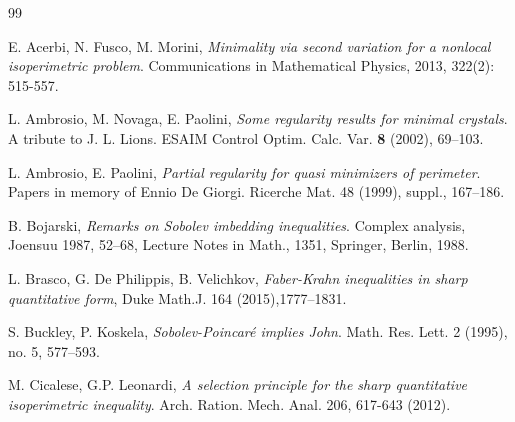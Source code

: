 \documentclass[reqno,11pt]{amsart}
\numberwithin{equation}{section}
\theoremstyle{remark}
\begin{document}
\begin{thebibliography}{99}

E. Acerbi, N. Fusco, M. Morini, \emph{Minimality via second variation for
a nonlocal isoperimetric problem}. Communications in Mathematical Physics, 2013, 322(2): 515-557.

L. Ambrosio, M. Novaga, E.  Paolini, 
\emph{Some regularity results for minimal crystals}.  A tribute to J. L. Lions. 
ESAIM Control Optim. Calc. Var. \textbf{8} (2002), 69--103.
 
 L. Ambrosio, E. Paolini, \emph{Partial regularity for quasi minimizers of perimeter}. Papers in memory of Ennio De Giorgi. Ricerche Mat. 48 (1999), suppl., 167--186.


 B. Bojarski,
\emph{Remarks on Sobolev imbedding inequalities}. Complex analysis, Joensuu 1987, 52--68,
Lecture Notes in Math., 1351, Springer, Berlin, 1988.


 
L. Brasco, G. De Philippis, B. Velichkov, \emph{Faber-Krahn inequalities in sharp quantitative form}, Duke Math.J.
 164 (2015),1777--1831.

S. Buckley, P.  Koskela, \emph{Sobolev-Poincar\'e implies John}.  
Math. Res. Lett. 2 (1995), no. 5, 577--593.



M. Cicalese, G.P. Leonardi, \emph{A selection principle for the sharp quantitative isoperimetric inequality}. Arch. Ration. Mech. Anal. 206, 617-643 (2012).




\end{thebibliography}
\end{document}

